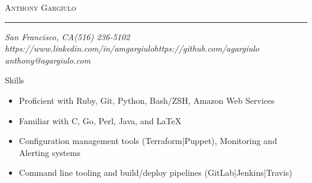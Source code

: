 \documentclass[10pt,oneside]{article}
\makeatletter
\newcommand{\name}{Anthony Gargiulo}
\newcommand{\addr}{San Francisco, CA}
\newcommand{\mobilePhone}{(516) 236-5102}
\newcommand{\email}{anthony@agargiulo.com}
\newcommand{\github}{https://github.com/agargiulo}
\newcommand{\linkedin}{https://www.linkedin.com/in/amgargiulo}
\newcommand{\bigname}[1]{
	\begin{center}\fontfamily{bch}\selectfont\Huge\scshape#1\end{center}
}
\newenvironment{ressection}[1]{
	\vspace{2pt}
	{\fontfamily{bch}\selectfont\Large#1}
	\begin{itemize}
	\vspace{1pt}
}{
	\end{itemize}
}
\newcommand{\ressubitem}[1]{
	\vspace{-1pt}
	\item \begin{flushleft} #1 \end{flushleft}
}
\makeatother
\begin{document}
 \selectfont

\bigname{\name}

\vspace{-4pt} \rule{\textwidth}{1pt}

\vspace{-1pt} {\normalsize\itshape \addr \hfill \mobilePhone \\ \linkedin \hfill \github \\ \email}

\vspace{10 pt}



\begin{ressection}{Skills}
	\ressubitem{Proficient with Ruby, Git, Python, Bash/ZSH, Amazon Web Services}
	\ressubitem{Familiar with C, Go, Perl, Java, and \LaTeX}
	\ressubitem{Configuration management tools (Terraform|Puppet), Monitoring and Alerting systems}
	\ressubitem{Command line tooling and build/deploy pipelines (GitLab|Jenkins|Travis)}
\end{ressection}
\end{document}
